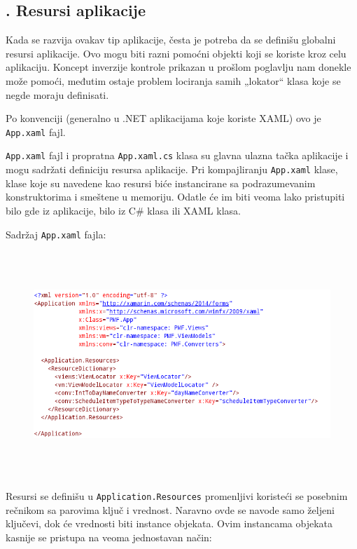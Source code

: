 \documentclass[a4paper]{article}
\begin{document}
\subsection[7.5. Resursi aplikacije]{. Resursi aplikacije}
\hypertarget{RefHeadingToc854882405265}{}Kada se razvija ovakav tip
aplikacije, česta je potreba da se definišu globalni resursi
aplikacije. Ovo mogu biti razni pomoćni objekti koji se koriste kroz
celu aplikaciju. Koncept inverzije kontrole prikazan u prošlom
poglavlju nam donekle može pomoći, međutim ostaje problem lociranja
samih „lokator“ klasa koje se negde moraju definisati. 

Po konvenciji (generalno u .NET aplikacijama koje koriste XAML) ovo je
\texttt{\textcolor[rgb]{0.0,0.4,0.8}{App.xaml}} fajl.

\texttt{\textcolor[rgb]{0.0,0.4,0.8}{App.xaml}} fajl i propratna
\texttt{\textcolor[rgb]{0.0,0.4,0.8}{App.xaml.cs}} klasa su glavna
ulazna tačka aplikacije i mogu sadržati definiciju resursa aplikacije.
Pri kompajliranju \texttt{\textcolor[rgb]{0.0,0.4,0.8}{App.xaml}}
klase, klase koje su navedene kao resursi biće instancirane sa
podrazumevanim konstruktorima i smeštene u memoriju. Odatle će im biti
veoma lako pristupiti bilo gde iz aplikacije, bilo iz C\# klasa ili
XAML klasa.

Sadržaj \texttt{\textcolor[rgb]{0.0,0.4,0.8}{App.xaml}} fajla:



\begin{figure}
\centering
\includegraphics[width=170mm,height=85mm]{msc-img44.png}
\end{figure}
Resursi se definišu u
\texttt{\textcolor[rgb]{0.0,0.4,0.8}{Application.Resources}}
promenljivi koristeći se posebnim rečnikom sa parovima ključ i
vrednost. Naravno ovde se navode samo željeni ključevi, dok će
vrednosti biti instance objekata. Ovim instancama objekata kasnije se
pristupa na veoma jednostavan način:
\end{document}
